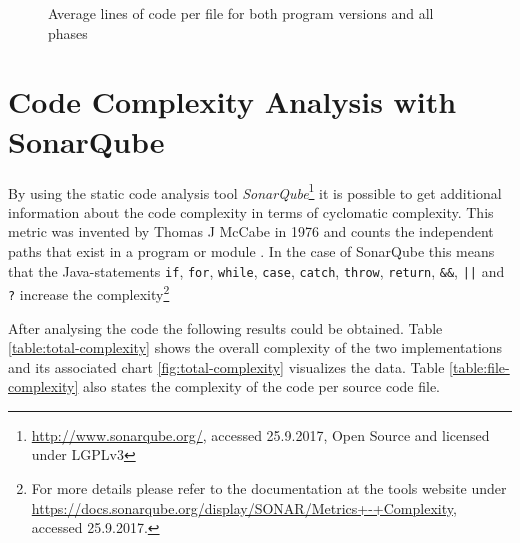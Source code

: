 \begin{figure}

	\centering
	\caption{Average lines of code per file for both program versions and all phases}
	\label{fig:avg-lines}
\end{figure}

\section{Code Complexity Analysis with SonarQube}
\label{sec:complexity}
By using the static code analysis tool \emph{SonarQube}\footnote{\href{http://www.sonarqube.org/}{http://www.sonarqube.org/}, accessed 25.9.2017, Open Source and licensed under LGPLv3} it is possible to get additional information about the code complexity in terms of cyclomatic complexity. This metric was invented by Thomas J McCabe in 1976 and counts the independent paths that exist in a program or module \cite{cyclo}. In the case of SonarQube this means that the Java-statements \texttt{if}, \texttt{for}, \texttt{while}, \texttt{case}, \texttt{catch}, \texttt{throw}, \texttt{return}, \texttt{\&\&}, \texttt{||} and \texttt{?} increase the complexity\footnote{For more details please refer to the documentation at the tools website under \href{https://docs.sonarqube.org/display/SONAR/Metrics+-+Complexity}{https://docs.sonarqube.org/display/SONAR/Metrics+-+Complexity}, accessed 25.9.2017.}

After analysing the code the following results could be obtained. Table \ref{table:total-complexity} shows the overall complexity of the two implementations and its associated chart \ref{fig:total-complexity} visualizes the data. Table \ref{table:file-complexity} also states the complexity of the code per source code file.

